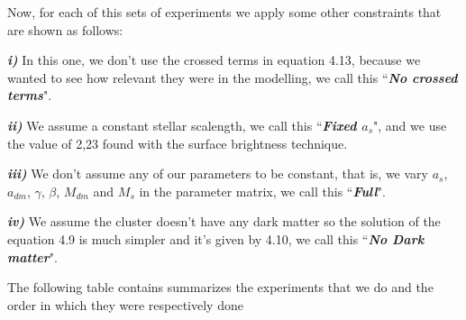 Now, for each of this sets of experiments we apply some other constraints that are shown as follows: 

\textbf{\textit{i)}} In this one, we don't use the crossed terms in equation 4.13, because we wanted to see how relevant they were in the modelling, we call this ``\textbf{\textit{No crossed terms}}". 

\textbf{\textit{ii)}} We assume a constant stellar scalength, we call this ``\textbf{\textit{Fixed $a_{s}$}}", and we use the value of 2,23 found with the surface brightness technique. 

\textbf{\textit{iii)}} We don't assume any of our parameters to be constant, that is, we vary $a_{s}$, $a_{dm}$, $\gamma$, $\beta$, $M_{dm}$ and $M_{s}$ in the parameter matrix, we call this ``\textbf{\textit{Full}}". 

\textbf{\textit{iv)}} We assume the cluster doesn't have any dark matter so the solution of the equation 4.9 is much simpler and it's given by 4.10, we call this ``\textbf{\textit{No Dark matter}}".

The following table contains summarizes the experiments that we do and the order in which they were respectively done

